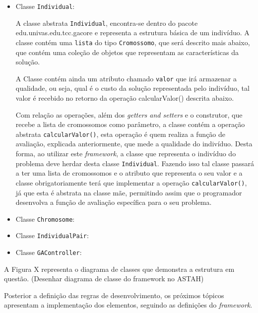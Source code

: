 \begin{itemize}
 	\item Classe \texttt{Individual}:
	 	\par A classe abstrata \texttt{Individual}, encontra-se dentro do pacote edu.univas.edu.tcc.gacore e  
	 	representa a estrutura básica de um indivíduo. A classe contém uma \texttt{lista} do tipo \texttt{Cromossomo}, que será 
	 	descrito mais abaixo, que contém uma coleção de objetos que representam as características da solução. 
	 	\par A Classe contém ainda um atributo chamado \texttt{valor} que irá armazenar a qualidade, ou seja, qual é o custo
	 	da solução representada pelo indivíduo, tal valor é recebido no retorno da operação calcularValor() descrita abaixo.
	 	\par Com relação as operações, além dos \textit{getters and setters} e o construtor, que recebe a lista de cromossomos como
	 	parâmetro, a classe contém a operação abstrata \texttt{calcularValor()}, esta operação é quem realiza a função de avaliação, 
	 	explicada anteriormente, que mede a qualidade do indivíduo. Desta forma, ao utilizar este \textit{framework}, a
	 	classe que representa o indivíduo do problema deve herdar desta classe  \texttt{Individual}. Fazendo isso tal classe passará a ter uma
	 	lista de cromossomos e o atributo que representa o seu valor e a classe obrigatoriamente terá que implementar a operação 
	 	\texttt{calcularValor()}, já que esta é abstrata na classe mãe, permitindo assim que o programador desenvolva a função de avaliação específica para o seu problema.
 
	\item Classe \texttt{Chromosome}:
		\par 
 	
 	\item Classe \texttt{IndividualPair}:
		 \par
 	
 	
 	\item Classe \texttt{GAController}:
 	
 	
 \end{itemize}

 A Figura X representa o diagrama de classes que demonstra a estrutura em questão.
 (Desenhar diagrama de classe do framework no ASTAH)


\par Posterior a definição das regras de desenvolvimento, os próximos tópicos apresentam a implementação 
dos elementos, seguindo as definições do \textit{framework}.


